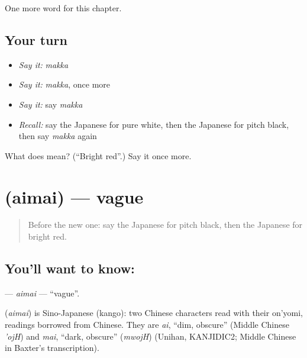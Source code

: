 \begin{grammarlens}[title={What you've built}]
One more word for this chapter.
\end{grammarlens}

\subsection*{Your turn}
\begin{itemize}
\raggedright
  \item \emph{Say it:} \emph{makka}
  \item \emph{Say it:} \emph{makka}, once more
  \item \emph{Say it:} say \emph{makka}
  \item \emph{Recall:} say the Japanese for pure white, then the Japanese for pitch black, then say \emph{makka} again
\end{itemize}

\begin{tcolorbox}[breakable,colback=teal!4,colframe=teal!35!black,title={Before you move on}]
What does  mean? (\textquotedblleft{}Bright red\textquotedblright{}.) Say it once more.
\end{tcolorbox}
\section[\texorpdfstring{\ja{あいまい} (aimai)}{あいまい (aimai)}]{ (aimai) — vague}

\label{lesson:JA-C130-aimai}



\begin{quote}
Before the new one: say the Japanese for pitch black, then the Japanese for bright red.
\end{quote}

\subsection*{You'll want to know: }
\textbf{} — \emph{aimai} — \textquotedblleft{}vague\textquotedblright{}.

\begin{cousinweb}
\textbf{} (\emph{aimai}) is Sino-Japanese (kango): two Chinese characters read with their on'yomi, readings borrowed from Chinese. They are \emph{ai}, \textquotedblleft{}dim, obscure\textquotedblright{} (Middle Chinese \emph{'ojH}) and \emph{mai}, \textquotedblleft{}dark, obscure\textquotedblright{} (\emph{mwojH}) (Unihan, KANJIDIC2; Middle Chinese in Baxter's transcription).
\end{cousinweb}

